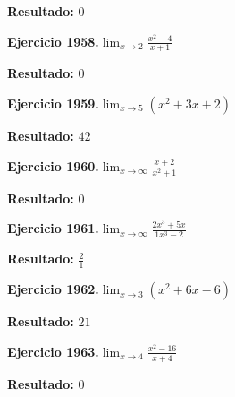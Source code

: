 \documentclass[10pt,a4paper]{article}
\begin{document}
\begin{solbox}
\textbf{Resultado:} \(\displaystyle 0\)
\end{solbox}

\begin{ejbox}
\textbf{Ejercicio 1958.}\quad $\lim_{x\to 2} \frac{x^2-4}{x+1}$
\end{ejbox}

\begin{solbox}
\textbf{Resultado:} \(\displaystyle 0\)
\end{solbox}

\begin{ejbox}
\textbf{Ejercicio 1959.}\quad $\lim_{x\to 5} (x^2 +3x +2)$
\end{ejbox}

\begin{solbox}
\textbf{Resultado:} \(\displaystyle 42\)
\end{solbox}

\newpage
\begin{ejbox}
\textbf{Ejercicio 1960.}\quad $\lim_{x\to \infty} \frac{x + 2}{x^2 + 1}$
\end{ejbox}

\begin{solbox}
\textbf{Resultado:} \(\displaystyle 0\)
\end{solbox}

\begin{ejbox}
\textbf{Ejercicio 1961.}\quad $\lim_{x\to \infty} \frac{2x^3 + 5x}{1x^3 - 2}$
\end{ejbox}

\begin{solbox}
\textbf{Resultado:} \(\displaystyle \frac{2}{1}\)
\end{solbox}

\begin{ejbox}
\textbf{Ejercicio 1962.}\quad $\lim_{x\to 3} (x^2 +6x -6)$
\end{ejbox}

\begin{solbox}
\textbf{Resultado:} \(\displaystyle 21\)
\end{solbox}

\newpage
\begin{ejbox}
\textbf{Ejercicio 1963.}\quad $\lim_{x\to 4} \frac{x^2-16}{x+4}$
\end{ejbox}

\begin{solbox}
\textbf{Resultado:} \(\displaystyle 0\)
\end{solbox}
\end{document}
